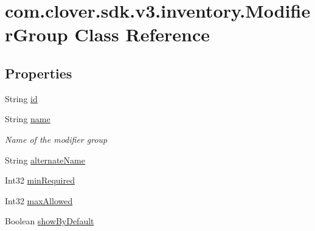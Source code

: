 \hypertarget{classcom_1_1clover_1_1sdk_1_1v3_1_1inventory_1_1_modifier_group}{}\section{com.\+clover.\+sdk.\+v3.\+inventory.\+Modifier\+Group Class Reference}
\label{classcom_1_1clover_1_1sdk_1_1v3_1_1inventory_1_1_modifier_group}
\subsection*{Properties}
\begin{DoxyCompactItemize}
\item 
String \hyperlink{classcom_1_1clover_1_1sdk_1_1v3_1_1inventory_1_1_modifier_group_a8a7f7fc204c50613d257bb577106ab3b}{id}
\item 
String \hyperlink{classcom_1_1clover_1_1sdk_1_1v3_1_1inventory_1_1_modifier_group_ac8ccb2e4d8bc23bbd6d8fd2336951c26}{name}
\begin{DoxyCompactList}\small\item\em Name of the modifier group \end{DoxyCompactList}\item 
String \hyperlink{classcom_1_1clover_1_1sdk_1_1v3_1_1inventory_1_1_modifier_group_aba0d799002ca5989e4e3f2e399ed2ac0}{alternate\+Name}
\item 
Int32 \hyperlink{classcom_1_1clover_1_1sdk_1_1v3_1_1inventory_1_1_modifier_group_a507c73165be4e9eb29ee09b0e37a5605}{min\+Required}
\item 
Int32 \hyperlink{classcom_1_1clover_1_1sdk_1_1v3_1_1inventory_1_1_modifier_group_a4ad730845803384fceda210b78355e78}{max\+Allowed}
\item 
Boolean \hyperlink{classcom_1_1clover_1_1sdk_1_1v3_1_1inventory_1_1_modifier_group_a1ecb30928853e5d1f69ac28435d441b8}{show\+By\+Default}
\item 

\end{DoxyCompactItemize}
